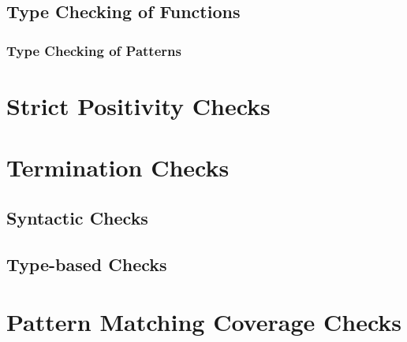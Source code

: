 \documentclass[acmsmall]{acmart}
\begin{document}
\subsection{Type Checking of Functions}

\subsubsection{Type Checking of Patterns}
\label{sec:typeCheckPattern}

\section{Strict Positivity Checks}
\label{sec:spos}

\section{Termination Checks}
\label{sec:termination}

\subsection{Syntactic Checks}

\subsection{Type-based Checks}

\section{Pattern Matching Coverage Checks}
\label{sec:pattern}
\end{document}
